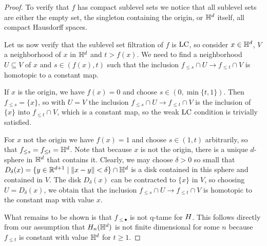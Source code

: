 \begin{proof}
	To verify that $f$ has compact sublevel sets we notice that all sublevel sets are either the empty set, the singleton containing the origin, or $\mathbb{H}^d$ itself, all compact Hausdorff spaces.
	
	Let us now verify that the sublevel set filtration of $f$ is $\mathrm{LC}$, so
	consider $x \in \mathbb{H}^d$, $V$ a neighborhood of $x$ in $\mathbb{H}^d$ and $t > f(x)$. We need to find a neighborhood $U \subseteq V$ of $x$ and $s \in (f(x), t)$ such that the inclusion $f_{\leq s} \cap U \to f_{\leq t} \cap V$ is homotopic to a constant map.
	
	If $x$ is the origin, we have $f(x) = 0$ and choose $s \in (0, \min\{t, 1\})$.
	Then $f_{\leq s} = \{x\}$, so with $U = V$ the inclusion $f_{\leq s} \cap U \to f_{\leq t} \cap V$ is the inclusion of $\{x\}$ into $f_{\leq t} \cap V$, which is a constant map, so the weak $\mathrm{LC}$ condition is trivially satisfied.
	
	For $x$ not the origin we have $f(x) = 1$ and choose $s \in (1,t)$ arbitrarily, so that $f_{\leq s} = f_{\leq t} = \mathbb{H}^d$. 
	Note that because $x$ is not the origin, there is a unique $d$-sphere in $\mathbb{H}^d$ that contains it.
	Clearly, we may choose $\delta > 0$ so small that $D_{\delta}(x) = \{y \in \mathbb{R}^{d+1} \mid \Vert x - y \Vert < \delta\} \cap \mathbb{H}^d$ is a disk contained in this sphere and contained in $V$. 
	The disk $D_\delta(x)$ can be contracted to $\{x\}$ in $V$, so choosing $U = D_{\delta}(x)$, we obtain that the inclusion $f_{\leq s} \cap U \to f_{\leq t} \cap V$ is homotopic to the constant map with value $x$.
	
	What remains to be shown is that $f_{\leq \bullet}$ is not q-tame for $H$.
	This follows directly from our assumption that $H_{n}(\mathbb{H}^d)$ is not finite dimensional for some $n$ because $f_{\leq t}$ is constant with value $\mathbb{H}^d$ for $t \geq 1$.
\end{proof}

